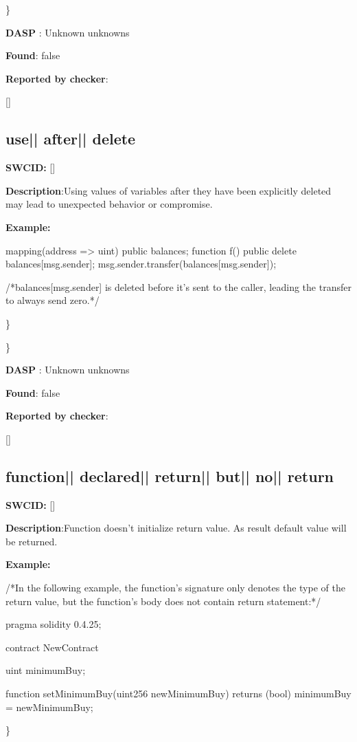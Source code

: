 \documentclass{article}
\begin{document}
\} 

\textbf{DASP} : Unknown unknowns

\textbf{Found}: false

\textbf{Reported by checker}: 
\begin{ffcode} 

[]
\end{ffcode} 
\subsection{use{|\textunderscore| }after{|\textunderscore| }delete} 
\textbf{SWC{\textunderscore }ID:} []

\textbf{Description}:Using values of variables after they have been explicitly deleted may lead to unexpected behavior or compromise.


\textbf{Example:} 
\begin{ffcode} 

mapping(address => uint) public balances;
function f() public {
    delete balances[msg.sender];
    msg.sender.transfer(balances[msg.sender]);
}

 /*balances[msg.sender] is deleted before it's sent to the caller, leading the transfer to always send zero.*/ 

\end{ffcode} 
\} 

\} 

\textbf{DASP} : Unknown unknowns

\textbf{Found}: false

\textbf{Reported by checker}: 
\begin{ffcode} 

[]
\end{ffcode} 
\subsection{function{|\textunderscore| }declared{|\textunderscore| }return{|\textunderscore| }but{|\textunderscore| }no{|\textunderscore| }return} 
\textbf{SWC{\textunderscore }ID:} []

\textbf{Description}:Function doesn't initialize return value. As result default value will be returned.


\textbf{Example:} 
\begin{ffcode} 

/*In the following example, the function's signature only denotes the type of the return value, but the function's body does not contain return statement:*/ 

pragma solidity 0.4.25;

contract NewContract {
    uint minimumBuy;

    function setMinimumBuy(uint256 newMinimumBuy) returns (bool){
        minimumBuy = newMinimumBuy;
    }
}

\end{ffcode} 
\} 
\end{document}
